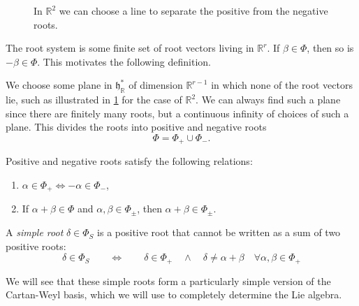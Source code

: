 \begin{figure}[tbph]
  \centering
  \def\svgwidth{0.4\columnwidth}
  
  \caption{In $\mathbb{R}^2$ we can choose a line to separate the positive from the negative roots.}
  \label{fig:l18f2}
\end{figure}

The root system is some finite set of root vectors living in $\mathbb{R}^r$. If $\beta \in \Phi$, then so is  $-\beta \in \Phi$.
This motivates the following definition. 
\begin{definition}
  We choose some plane in $\mathfrak{h}^*_{\mathbb{R}}$ of dimension  $\mathbb{R}^{r-1}$ in which none of the root vectors lie, such as illustrated in \ref{fig:l18f2} for the case of $\mathbb{R}^2$.
  We can always find such a plane since there are finitely many roots, but a continuous infinity of choices of such a plane.
  This divides the roots into positive and negative roots
  \begin{equation}
    \Phi = \Phi_+ \cup \Phi_-.
  \end{equation}
\end{definition}
Positive and negative roots satisfy the following relations:
\begin{enumerate}
  \item $\alpha \in \Phi_+ \iff -\alpha \in \Phi_-$,
  \item If $\alpha + \beta \in \Phi$ and $\alpha, \beta \in \Phi_{\pm}$, then $\alpha + \beta \in \Phi_{\pm}$.
\end{enumerate}
\begin{definition}
  A \emph{simple root} $\delta \in \Phi_S$ is a positive root that cannot be written as a sum of two positive roots:
  \begin{equation}
    \delta \in \Phi_S \qquad \iff \qquad
    \delta \in \Phi_+ \quad \wedge \quad \delta \neq \alpha + \beta \quad \forall \alpha, \beta \in \Phi_+
  \end{equation}
\end{definition}
We will see that these simple roots form a particularly simple version of the Cartan-Weyl basis, which we will use to completely determine the Lie algebra.
